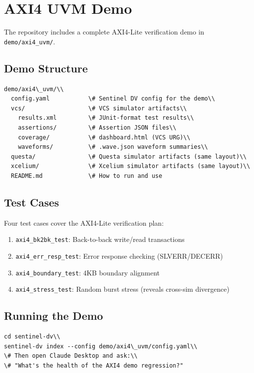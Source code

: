 \documentclass[11pt,a4paper]{article}
\begin{document}
\section{AXI4 UVM Demo}

The repository includes a complete AXI4-Lite verification demo in
\texttt{demo/axi4\_uvm/}.

\subsection{Demo Structure}
\begin{lstlisting}[style=yaml,numbers=none,xleftmargin=0em]
demo/axi4\_uvm/\\
  config.yaml           \# Sentinel DV config for the demo\\
  vcs/                  \# VCS simulator artifacts\\
    results.xml         \# JUnit-format test results\\
    assertions/         \# Assertion JSON files\\
    coverage/           \# dashboard.html (VCS URG)\\
    waveforms/          \# .wave.json waveform summaries\\
  questa/               \# Questa simulator artifacts (same layout)\\
  xcelium/              \# Xcelium simulator artifacts (same layout)\\
  README.md             \# How to run and use
\end{lstlisting}

\subsection{Test Cases}
Four test cases cover the AXI4-Lite verification plan:
\begin{enumerate}
  \item \texttt{axi4\_bk2bk\_test}: Back-to-back write/read transactions
  \item \texttt{axi4\_err\_resp\_test}: Error response checking (SLVERR/DECERR)
  \item \texttt{axi4\_boundary\_test}: 4KB boundary alignment
  \item \texttt{axi4\_stress\_test}: Random burst stress (reveals cross-sim divergence)
\end{enumerate}

\subsection{Running the Demo}
\begin{lstlisting}[style=yaml,numbers=none,xleftmargin=0em]
cd sentinel-dv\\
sentinel-dv index --config demo/axi4\_uvm/config.yaml\\
\# Then open Claude Desktop and ask:\\
\# "What's the health of the AXI4 demo regression?"
\end{lstlisting}
\end{document}

